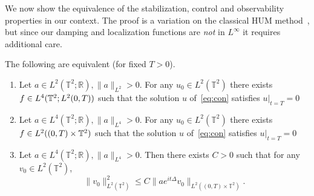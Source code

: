 \documentclass[10pt]{amsart}
\theoremstyle{definition}\newtheorem{defi}[theo]{Definition}\newtheorem{rema}[theo]{Remark}\newtheorem{exam}[theo]{Example}\newtheorem{exem}[theo]{Example}\newtheorem{nota}[theo]{Notation}
\newcommand{\R}{{\mathbb R}}
\newcommand{\TT}{{\mathbb T}}
\begin{document}
We now show the equivalence of the stabilization, control and observability properties in our context. The proof is a variation on the classical HUM method~\cite{Li}, but since our damping and localization functions are \emph{not} in $L^\infty$ it requires additional care.
\begin{prop}\label{p:hum}
The following are equivalent (for fixed $T>0$).
\begin{enumerate}
\item \label{i}
Let $a \in L^2(\TT^2;\R), \| a \|_{L^2} >0$. For any $u_0\in L^2(\TT^2)$ there exists $f \in\linebreak L^4(\TT^2 ; L^2(0,T))$ such that the solution $u$ of~\eqref{eq:con} satisfies $u|_{t=T} =0$
\item \label{ii}
Let $a \in L^4(\TT^2;\R), \| a \|_{L^4} >0$. For any $u_0\in L^2(\TT^2)$ there exists $f \in\linebreak L^2((0,T)\times \TT^2)$ such that the solution $u$ of~\eqref{eq:con} satisfies $u |_{t=T} =0$
\item \label{iii}
Let $a \in L^4(\TT^2;\R), \| a \|_{L^4} >0$. Then there exists $C>0$ such that for any $v_0 \in L^2(\TT^2)$,
\begin{equation}\label{observation}
\| v_0 \|_{L^2(\TT^2)}^2 \leq C \| a e^{it \Delta} v_0 \| _{L^2((0,T) \times \TT^2)}.
\end{equation}
\end{enumerate}
\end{prop}
\end{document}
